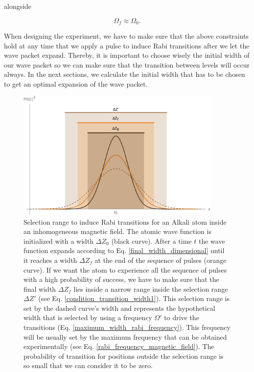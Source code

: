 \documentclass{article}
\begin{document}
alongside

\begin{equation}
    \Omega_{f} \approx \Omega_{0}.
\end{equation}
    
When designing the experiment, we have to make sure that the above constraints hold at any time that we apply a pulse to induce Rabi transitions after we let the wave packet expand. Thereby, it is important to choose wisely the initial width of our wave packet so we can make sure that the transition between levels will occur always. In the next sections, we calculate the initial width that has to be chosen to get an optimal expansion of the wave packet.

\begin{figure}
    \centering
    \includegraphics[width=0.9\textwidth]{working_area.png}
     \caption{Selection range to induce Rabi transitions for an Alkali atom inside an inhomogeneous magnetic field. The atomic wave function is initialized with a width $\Delta Z_{0}$ (black curve). After a time $t$ the wave function expands according to Eq. \ref{final_width_dimensional} until it reaches a width $\Delta Z_{f}$ at the end of the sequence of pulses (orange curve). If we want the atom to experience all the sequence of pulses with a high probability of success, we have to make sure that the final width $\Delta Z_{f}$ lies inside a narrow range inside the selection range $\Delta Z'$ (see Eq. \ref{condition_transition_width1}). This selection range is set by the dashed curve's width and represents the hypothetical width that is selected by using a frequency $\Omega'$ to drive the transitions (Eq. \ref{maximum_width_rabi_frequency}). This frequency will be usually set by the maximum frequency that can be obtained experimentally (see Eq. \ref{rabi_frequency_magnetic_field}). The probability of transition for positions outside the selection range is so small that we can consider it to be zero.}
     \label{selection_range_figure}
\end{figure}
\end{document}
